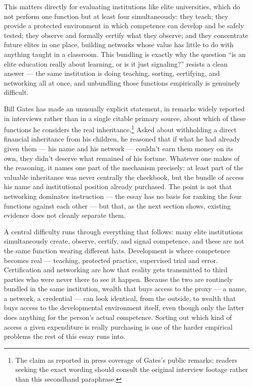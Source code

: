 \documentclass[11pt]{article}
\begin{document}
This matters directly for evaluating institutions like elite universities, which do not perform one function but at least four simultaneously: they teach; they provide a protected environment in which competence can develop and be safely tested; they observe and formally certify what they observe; and they concentrate future elites in one place, building networks whose value has little to do with anything taught in a classroom. This bundling is exactly why the question ``is an elite education really about learning, or is it just signaling?'' resists a clean answer --- the same institution is doing teaching, sorting, certifying, and networking all at once, and unbundling those functions empirically is genuinely difficult.

Bill Gates has made an unusually explicit statement, in remarks widely reported in interviews rather than in a single citable primary source, about which of these functions he considers the real inheritance.\footnote{The claim as reported in press coverage of Gates's public remarks; readers seeking the exact wording should consult the original interview footage rather than this secondhand paraphrase.} Asked about withholding a direct financial inheritance from his children, he reasoned that if what he had already given them --- his name and his network --- couldn't earn them money on its own, they didn't deserve what remained of his fortune. Whatever one makes of the reasoning, it names one part of the mechanism precisely: at least part of the valuable inheritance was never centrally the checkbook, but the bundle of access his name and institutional position already purchased. The point is not that networking dominates instruction --- the essay has no basis for ranking the four functions against each other --- but that, as the next section shows, existing evidence does not cleanly separate them.

A central difficulty runs through everything that follows: many elite institutions simultaneously create, observe, certify, and signal competence, and these are not the same function wearing different hats. Development is where competence becomes real --- teaching, protected practice, supervised trial and error. Certification and networking are how that reality gets transmitted to third parties who were never there to see it happen. Because the two are routinely bundled in the same institution, wealth that buys access to the proxy --- a name, a network, a credential --- can look identical, from the outside, to wealth that buys access to the developmental environment itself, even though only the latter does anything for the person's actual competence. Sorting out which kind of access a given expenditure is really purchasing is one of the harder empirical problems the rest of this essay runs into.
\end{document}
